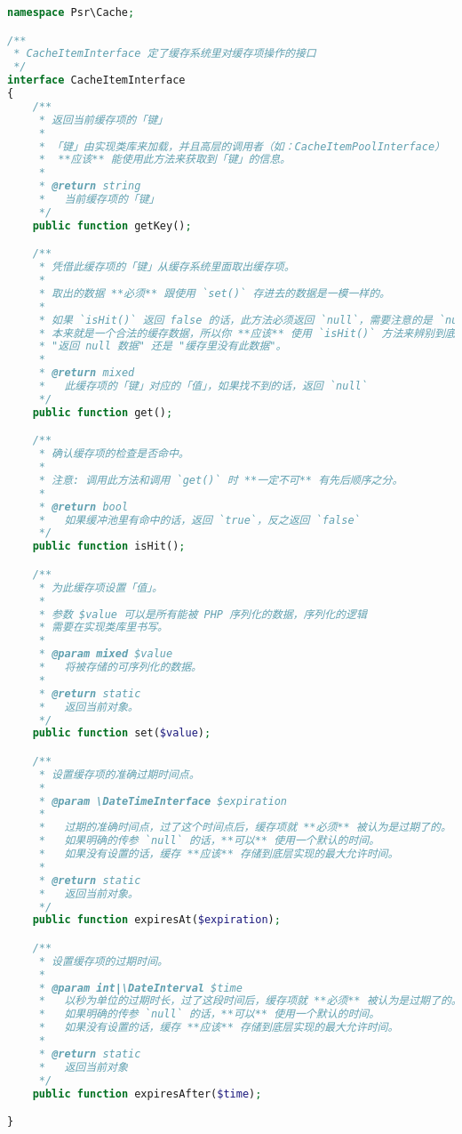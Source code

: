 \begin{lstlisting}[language=PHP]
namespace Psr\Cache;

/**
 * CacheItemInterface 定了缓存系统里对缓存项操作的接口
 */
interface CacheItemInterface
{
    /**
     * 返回当前缓存项的「键」
     * 
     * 「键」由实现类库来加载，并且高层的调用者（如：CacheItemPoolInterface）
     *  **应该** 能使用此方法来获取到「键」的信息。
     *
     * @return string
     *   当前缓存项的「键」
     */
    public function getKey();

    /**
     * 凭借此缓存项的「键」从缓存系统里面取出缓存项。
     *
     * 取出的数据 **必须** 跟使用 `set()` 存进去的数据是一模一样的。
     *
     * 如果 `isHit()` 返回 false 的话，此方法必须返回 `null`，需要注意的是 `null` 
     * 本来就是一个合法的缓存数据，所以你 **应该** 使用 `isHit()` 方法来辨别到底是
     * "返回 null 数据" 还是 "缓存里没有此数据"。
     *
     * @return mixed
     *   此缓存项的「键」对应的「值」，如果找不到的话，返回 `null`
     */
    public function get();

    /**
     * 确认缓存项的检查是否命中。
     * 
     * 注意: 调用此方法和调用 `get()` 时 **一定不可** 有先后顺序之分。
     *
     * @return bool
     *   如果缓冲池里有命中的话，返回 `true`，反之返回 `false`
     */
    public function isHit();

    /**
     * 为此缓存项设置「值」。
     *
     * 参数 $value 可以是所有能被 PHP 序列化的数据，序列化的逻辑
     * 需要在实现类库里书写。
     *
     * @param mixed $value
     *   将被存储的可序列化的数据。
     *
     * @return static
     *   返回当前对象。
     */
    public function set($value);

    /**
     * 设置缓存项的准确过期时间点。
     *
     * @param \DateTimeInterface $expiration
     * 
     *   过期的准确时间点，过了这个时间点后，缓存项就 **必须** 被认为是过期了的。
     *   如果明确的传参 `null` 的话，**可以** 使用一个默认的时间。
     *   如果没有设置的话，缓存 **应该** 存储到底层实现的最大允许时间。
     *
     * @return static
     *   返回当前对象。
     */
    public function expiresAt($expiration);

    /**
     * 设置缓存项的过期时间。
     *
     * @param int|\DateInterval $time
     *   以秒为单位的过期时长，过了这段时间后，缓存项就 **必须** 被认为是过期了的。
     *   如果明确的传参 `null` 的话，**可以** 使用一个默认的时间。
     *   如果没有设置的话，缓存 **应该** 存储到底层实现的最大允许时间。
     *
     * @return static
     *   返回当前对象
     */
    public function expiresAfter($time);

}
\end{lstlisting}

